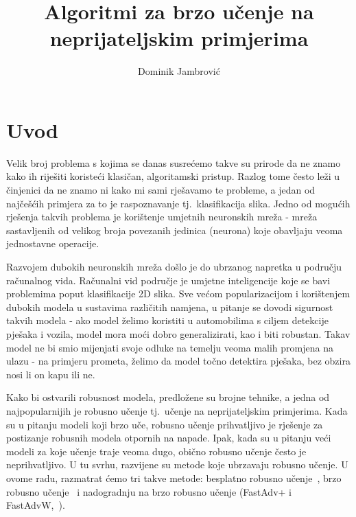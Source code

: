 \documentclass[times, utf8, zavrsni, numeric]{fer}
\begin{document}

\title{Algoritmi za brzo učenje na neprijateljskim primjerima}

\author{Dominik Jambrović}

\maketitle

% 


\tableofcontents

\chapter{Uvod}
Velik broj problema s kojima se danas susrećemo takve su prirode da ne znamo kako ih riješiti koristeći klasičan, algoritamski pristup. Razlog tome često leži u činjenici da ne znamo ni kako mi sami rješavamo te probleme, 
a jedan od najčešćih primjera za to je raspoznavanje tj.\ klasifikacija slika.
Jedno od mogućih rješenja takvih problema je korištenje umjetnih neuronskih mreža - mreža sastavljenih od velikog broja povezanih jedinica (neurona) koje obavljaju veoma jednostavne operacije.

Razvojem dubokih neuronskih mreža došlo je do ubrzanog napretka u području računalnog vida. Računalni vid područje je umjetne inteligencije koje se bavi problemima poput klasifikacije 2D slika. 
Sve većom popularizacijom i korištenjem dubokih modela u sustavima različitih namjena, u pitanje se dovodi sigurnost takvih modela -
ako model želimo koristiti u automobilima s ciljem detekcije pješaka i vozila, model mora moći dobro generalizirati, kao i biti robustan. Takav model ne bi smio mijenjati svoje odluke na temelju veoma malih promjena na ulazu -
na primjeru prometa, želimo da model točno detektira pješaka, bez obzira nosi li on kapu ili ne.

Kako bi ostvarili robusnost modela, predložene su brojne tehnike, a jedna od najpopularnijih je robusno učenje tj.\ učenje na neprijateljskim primjerima. 
Kada su u pitanju modeli koji brzo uče, robusno učenje prihvatljivo je rješenje za postizanje robusnih modela otpornih na napade. 
Ipak, kada su u pitanju veći modeli za koje učenje traje veoma dugo, obično robusno učenje često je neprihvatljivo. 
U tu svrhu, razvijene su metode koje ubrzavaju robusno učenje. U ovome radu, razmatrat ćemo tri takve metode: besplatno robusno učenje~\cite{shafahi2019adversarial}, brzo robusno učenje~\cite{wong2020fast} i
nadogradnju na brzo robusno učenje (FastAdv+ i FastAdvW,~\cite{li2020towards}). 
\end{document}
